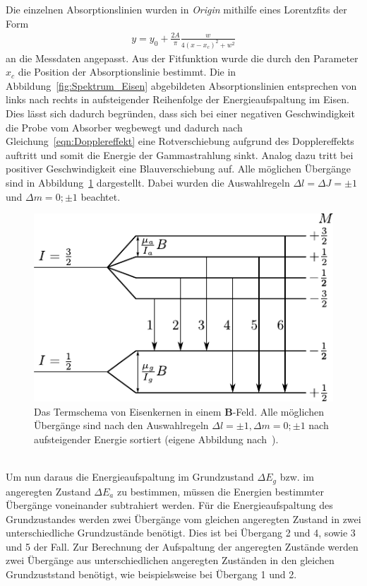 \documentclass[a4paper,twoside,final]{article}
\begin{document}
Die einzelnen Absorptionslinien wurden in \textit{Origin} mithilfe eines Lorentzfits der Form
\begin{align}
  y= y_0 + \frac{2A}{\pi}\frac{w}{4(x-x_c)^2+w^2}\label{eqn:Lorentzfits}
\end{align}
an die Messdaten angepasst. Aus der Fitfunktion wurde die durch den Parameter $x_c$ die Position der Absorptionslinie bestimmt. Die in Abbildung~\ref{fig:Spektrum_Eisen} abgebildeten Absorptionslinien entsprechen von links nach rechts in aufsteigender Reihenfolge der Energieaufspaltung im Eisen. Dies lässt sich dadurch begründen, dass sich bei einer negativen Geschwindigkeit die Probe vom Absorber wegbewegt und dadurch nach Gleichung~\eqref{eqn:Dopplereffekt} eine \glqq Rotverschiebung\grqq{} aufgrund des Dopplereffekts auftritt und somit die Energie der Gammastrahlung sinkt. Analog dazu tritt bei positiver Geschwindigkeit eine \glqq Blauverschiebung\grqq{} auf. Alle möglichen Übergänge sind in Abbildung~\ref{fig:Termschema_Eisen} dargestellt. Dabei wurden die Auswahlregeln $\Delta l = \Delta J = \pm 1$ und $\Delta m = 0; \pm 1$ beachtet.
\begin{figure}[htp]
    \centering
    \includegraphics{Bilder/Termschema_Eisen.pdf}
    \caption{Das Termschema von Eisenkernen in einem $\bm{B}$-Feld. Alle möglichen Übergänge sind nach den Auswahlregeln $\Delta l = \pm 1 , \Delta m = 0; \pm 1$ nach aufsteigender Energie sortiert (eigene Abbildung nach~\cite{Schatz}).}
    \label{fig:Termschema_Eisen}
\end{figure}\\
Um nun daraus die Energieaufspaltung im Grundzustand $\Delta E_g$ bzw. im angeregten Zustand $\Delta E_a$ zu bestimmen, müssen die Energien bestimmter Übergänge voneinander subtrahiert werden. Für die Energieaufspaltung des Grundzustandes werden zwei Übergänge vom gleichen angeregten Zustand in zwei unterschiedliche Grundzustände benötigt. Dies ist bei Übergang 2 und 4, sowie 3 und 5 der Fall. Zur Berechnung der Aufspaltung der angeregten Zustände werden zwei Übergänge aus unterschiedlichen angeregten Zuständen in den gleichen Grundzuststand benötigt, wie beispielsweise bei Übergang 1 und 2.\\
\end{document}
